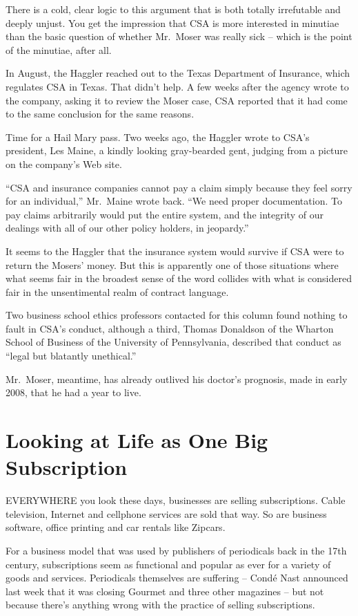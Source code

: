 ﻿\documentclass[12pt]{article}
\begin{document}
There is a cold, clear logic to this argument that is both totally irrefutable and deeply unjust.
You get the impression that CSA is more interested in minutiae than the basic question of whether
Mr.~Moser was really sick -- which is the point of the minutiae, after all.

In August, the Haggler reached out to the Texas Department of Insurance, which regulates CSA in
Texas. That didn't help. A few weeks after the agency wrote to the company, asking it to review the
Moser case, CSA reported that it had come to the same conclusion for the same reasons.

Time for a Hail Mary pass. Two weeks ago, the Haggler wrote to CSA's president, Les Maine, a kindly
looking gray-bearded gent, judging from a picture on the company's Web site.

``CSA and insurance companies cannot pay a claim simply because they feel sorry for an individual,''
Mr.~Maine wrote back. ``We need proper documentation. To pay claims arbitrarily would put the entire
system, and the integrity of our dealings with all of our other policy holders, in jeopardy.''

It seems to the Haggler that the insurance system would survive if CSA were to return the Mosers'
money. But this is apparently one of those situations where what seems fair in the broadest sense of
the word collides with what is considered fair in the unsentimental realm of contract language.

Two business school ethics professors contacted for this column found nothing to fault in CSA's
conduct, although a third, Thomas Donaldson of the Wharton School of Business of the University of
Pennsylvania, described that conduct as ``legal but blatantly unethical.''

Mr.~Moser, meantime, has already outlived his doctor's prognosis, made in early 2008, that he had a
year to live.

\section{Looking at Life as One Big Subscription}

\lettrine{E}{VERYWHERE} you look these days, businesses are selling
subscriptions. Cable television, Internet and cellphone services are sold that way. So are business
software, office printing and car rentals like Zipcars.

For a business model that was used by publishers of periodicals back in the 17th century,
subscriptions seem as functional and popular as ever for a variety of goods and services.
Periodicals themselves are suffering -- Cond\'e Nast announced last week that it was closing Gourmet
and three other magazines -- but not because there's anything wrong with the practice of selling
subscriptions.
\end{document}
